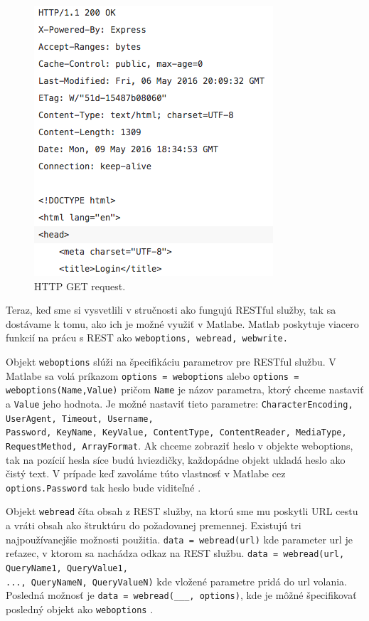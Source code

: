 \begin{figure}[H]
  \centering
  \includegraphics[scale=0.7]{img/rest/get-request.png}
  \caption{HTTP GET request.}
  \label{get-http}
\end{figure}

Teraz, keď sme si vysvetlili v stručnosti ako fungujú RESTful služby, tak sa dostávame k tomu, ako ich je možné využiť v Matlabe. Matlab poskytuje viacero funkcií na prácu s REST ako \verb|weboptions, webread, webwrite.|

Objekt \verb|weboptions| slúži na špecifikáciu parametrov pre RESTful službu. V Matlabe sa volá príkazom \verb|options = weboptions| alebo \verb|options = weboptions(Name,Value)| pričom \verb|Name| je názov parametra, ktorý chceme nastaviť a \verb|Value| jeho hodnota. Je možné nastaviť tieto parametre: \verb|CharacterEncoding, UserAgent, Timeout, Username,| \\ \verb|Password, KeyName, KeyValue, ContentType, ContentReader, MediaType,| \\ \verb|RequestMethod, ArrayFormat|. Ak chceme zobraziť heslo v objekte weboptions, tak na pozícií hesla síce budú hviezdičky, každopádne objekt ukladá heslo ako čistý text. V prípade keď zavoláme túto vlastnosť v Matlabe cez \verb|options.Password| tak heslo bude viditeľné \cite{matlab-weboptions}.

Objekt \verb|webread| číta obsah z REST služby, na ktorú sme mu poskytli URL cestu a vráti obsah ako štruktúru do požadovanej premennej. Existujú tri najpoužívanejšie možnosti použitia. \verb|data = webread(url)| kde parameter url je reťazec, v ktorom sa nachádza odkaz na REST službu. \verb|data = webread(url, QueryName1, QueryValue1,| \\ \verb|..., QueryNameN, QueryValueN)| kde vložené parametre pridá do url volania. Posledná možnosť je \verb|data = webread(___, options)|, kde je môžné špecifikovať posledný objekt ako \verb|weboptions| \cite{matlab-webread}.

